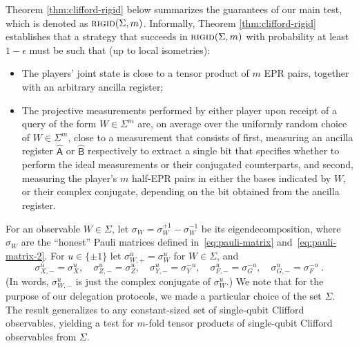 \documentclass[11pt]{article}
\newcommand{\reg}[1]{{\textsf{#1}}}
\newcommand{\rigid}{\textsc{rigid}}
\begin{document}
Theorem \ref{thm:clifford-rigid} below summarizes the guarantees of our main
test, which is denoted as $\rigid(\Sigma,m)$. Informally, Theorem \ref{thm:clifford-rigid} establishes that a strategy that succeeds in $\rigid(\Sigma,m)$ with probability at least  $1-\epsilon$ must be such that (up to local isometries):
\begin{itemize}
    \item The players' joint state is close to a tensor product of $m$ EPR pairs, together with an arbitrary ancilla register;
    \item The projective measurements performed by either player upon receipt of a query of the form $W\in\Sigma^m$ are, on average over the uniformly random choice of $W\in\Sigma^m$, close to a measurement that consists of first, measuring an ancilla register $\hat{\reg{A}}$ or $\hat{\reg{B}}$ respectively to extract a single bit that specifies whether to perform the ideal measurements or their conjugated counterparts, and second, measuring the player's $m$ half-EPR pairs in either the bases indicated by $W$, or their complex conjugate, depending on the bit obtained from the ancilla register. 
\end{itemize}

For an observable $W\in\Sigma$, let $\sigma_W = \sigma_W^{+1} - \sigma_W^{-1}$ be its eigendecomposition, where $\sigma_W$ are the ``honest'' Pauli matrices defined in~\eqref{eq:pauli-matrix} and~\eqref{eq:pauli-matrix-2}. For $u\in\{\pm 1\}$ let $\sigma_{W,+}^u = \sigma_W^u$ for $W\in \Sigma$, and 
$$ \sigma_{X,-}^u = \sigma_X^u,\quad\sigma_{Z,-}^u = \sigma_Z^u,\quad\sigma_{Y,-}^u = \sigma_Y^{-u},\quad\sigma_{F,-}^u = \sigma_G^{-u},\quad\sigma_{G,-}^u = \sigma_F^{-u}\;.$$
(In words, $\sigma_{W,-}^u$ is just the complex conjugate of $\sigma_W^u$.) We note that for the purpose of our delegation protocols, we made a particular choice of the set $\Sigma$. The result generalizes to any constant-sized set of single-qubit Clifford observables,  yielding a test for $m$-fold tensor products of single-qubit Clifford observables from $\Sigma$.
\end{document}
